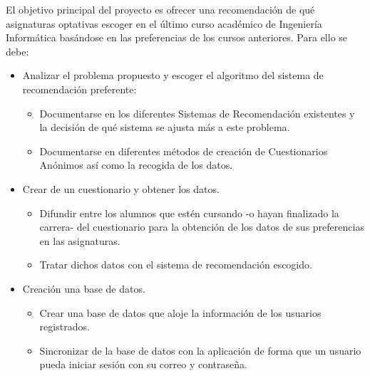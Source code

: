 El objetivo principal del proyecto es ofrecer una recomendación de qué  asignaturas optativas escoger en el último curso académico de Ingeniería Informática basándose en las preferencias de los cursos anteriores. Para ello se debe: 
\begin{itemize}
\item Analizar el problema propuesto y escoger el algoritmo del sistema de recomendación preferente: 
\begin{itemize}
\item Documentarse en los diferentes Sistemas de Recomendación existentes y la decisión de qué sistema se ajusta más a este problema. 
\item Documentarse en diferentes métodos de creación de Cuestionarios Anónimos así como la recogida de los datos. 
\end{itemize}
\item Crear de un cuestionario y obtener los datos. 
\begin{itemize}
\item Difundir entre  los alumnos que estén cursando -o hayan finalizado la carrera- del cuestionario para la obtención de los datos de sus preferencias en las asignaturas. 
\item Tratar dichos datos con el sistema de recomendación escogido.
\end{itemize}
\item Creación una base de datos. 
\begin{itemize}
\item Crear una base de datos que aloje la información de los usuarios registrados.
\item Sincronizar de la base de datos con la aplicación de forma que un usuario pueda iniciar sesión con su correo y contraseña. 
\end{itemize}
\end{itemize}